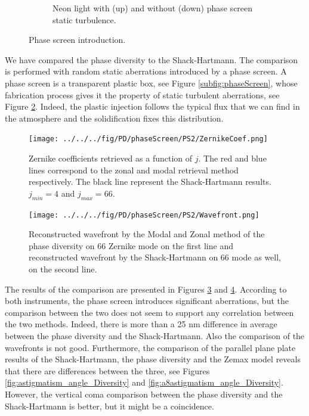 \begin{figure}
\begin{subfigure}{0.45\textwidth}
        \caption{Neon light with (up) and without (down) phase screen static turbulence.}
        \label{subfig:StaticTurbulenceEx}
    \end{subfigure}
    \decoRule
    \caption{Phase screen introduction.}
\end{figure}

We have compared the phase diversity to the Shack-Hartmann. The comparison is performed with random static aberrations introduced by a phase screen. A phase screen is a transparent plastic box, see Figure \ref{subfig:phaseScreen}, whose fabrication process gives it the property of static turbulent aberrations, see Figure \ref{subfig:StaticTurbulenceEx}. Indeed, the plastic injection follows the typical flux that we can find in the atmosphere and the solidification fixes this distribution.

\begin{figure}
\begin{center}
\texttt{[image: ../../../fig/PD/phaseScreen/PS2/ZernikeCoef.png]}
\decoRule
\caption{Zernike coefficients retrieved as a function of $j$. The red and blue lines correspond to the zonal and modal retrieval method respectively. The black line represent the Shack-Hartmann results. $j_{min}=4$ and $j_{max}=66$. }
\label{fig:ZernikeCoef}
\end{center}
\end{figure}

\begin{figure}
\begin{center}
\texttt{[image: ../../../fig/PD/phaseScreen/PS2/Wavefront.png]}
\decoRule
\caption{Reconstructed wavefront by the Modal and Zonal method of the phase diversity on 66 Zernike mode on the first line and reconstructed wavefront by the Shack-Hartmann on 66 mode as well, on the second line.}
\label{fig:Wavefront}
\end{center}
\end{figure}

The results of the comparison are presented in Figures \ref{fig:ZernikeCoef} and \ref{fig:Wavefront}. According to both instruments, the phase screen introduces significant aberrations, but the comparison between the two does not seem to support any correlation between the two methods. Indeed, there is more than a 25 nm difference in average between the phase diversity and the Shack-Hartmann. Also the comparison of the wavefronts is not good. Furthermore, the comparison of the parallel plane plate results of the Shack-Hartmann, the phase diversity and the Zemax model reveals that there are differences between the three, see Figures \ref{fig:astigmatism_angle_Diversity} and \ref{fig:a8astigmatism_angle_Diversity}. However, the vertical coma comparison between the phase diversity and the Shack-Hartmann is better, but it might be a coincidence.

